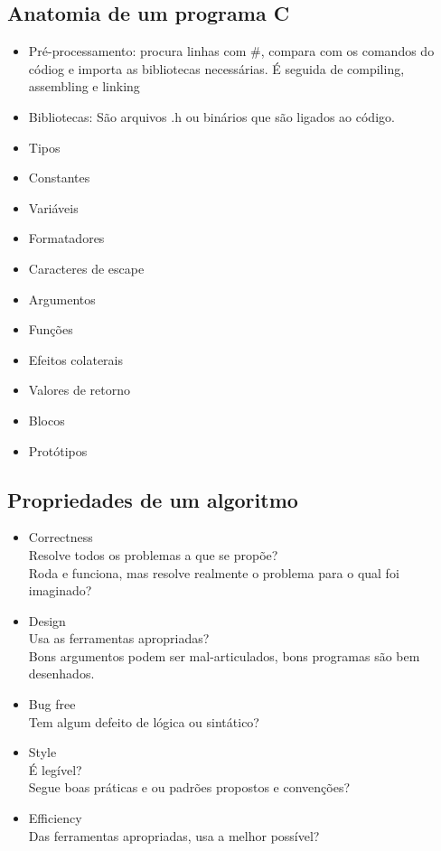 \documentclass[12pt,a4paper]{article} %
\begin{document}
\subsection{Anatomia de um programa C}
\begin{itemize}
\item Pré-processamento: procura linhas com \#, compara com os comandos do códiog e importa as bibliotecas necessárias. É seguida de compiling, assembling e linking
\item Bibliotecas: São arquivos .h ou binários que são ligados ao código.
\item Tipos
\item Constantes
\item Variáveis
\item Formatadores
\item Caracteres de escape
\item Argumentos
\item Funções
\item Efeitos colaterais
\item Valores de retorno
\item Blocos
\item Protótipos
\end{itemize}

\subsection{Propriedades de um algoritmo}
\begin{itemize}
\item Correctness\\Resolve todos os problemas a que se propõe?\\Roda e funciona, mas resolve realmente o problema para o qual foi imaginado?
\item Design\\Usa as ferramentas apropriadas?\\Bons argumentos podem ser mal-articulados, bons programas são bem desenhados.
\item Bug free\\Tem algum defeito de lógica ou sintático? 
\item Style\\É legível?\\Segue boas práticas e ou padrões propostos e convenções?
\item Efficiency\\Das ferramentas apropriadas, usa a melhor possível?
\end{itemize}
\end{document}
